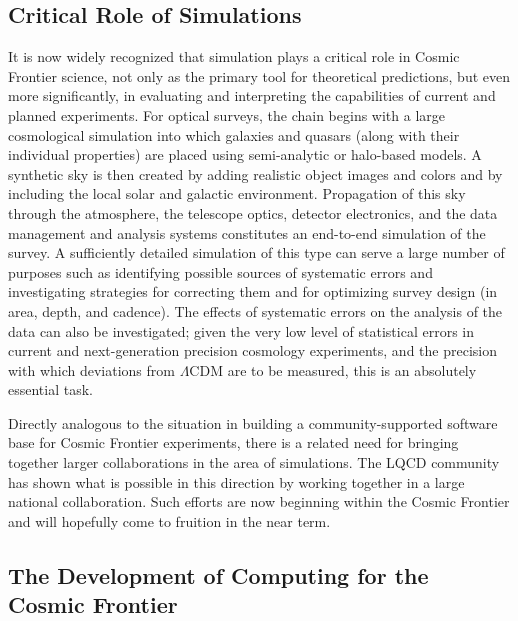 
\subsection{Critical Role of Simulations}

It is now widely recognized that simulation plays a critical role in
Cosmic Frontier science, not only as the primary tool for theoretical
predictions, but even more significantly, in evaluating and
interpreting the capabilities of current and planned experiments. For
optical surveys, the chain begins with a large cosmological simulation
into which galaxies and quasars (along with their individual
properties) are placed using semi-analytic or halo-based models. A
synthetic sky is then created by adding realistic object images and
colors and by including the local solar and galactic
environment. Propagation of this sky through the atmosphere, the
telescope optics, detector electronics, and the data management and
analysis systems constitutes an end-to-end simulation of the survey. A
sufficiently detailed simulation of this type can serve a large number
of purposes such as identifying possible sources of systematic errors
and investigating strategies for correcting them and for optimizing
survey design (in area, depth, and cadence). The effects of systematic
errors on the analysis of the data can also be investigated; given the
very low level of statistical errors in current and next-generation
precision cosmology experiments, and the precision with which
deviations from $\Lambda$CDM are to be measured, this is an absolutely
essential task.

Directly analogous to the situation in building a community-supported
software base for Cosmic Frontier experiments, there is a related need
for bringing together larger collaborations in the area of
simulations. The LQCD community has shown what is possible in this
direction by working together in a large national collaboration. Such
efforts are now beginning within the Cosmic Frontier and will
hopefully come to fruition in the near term.

\subsection{The Development of Computing for the Cosmic Frontier} 

